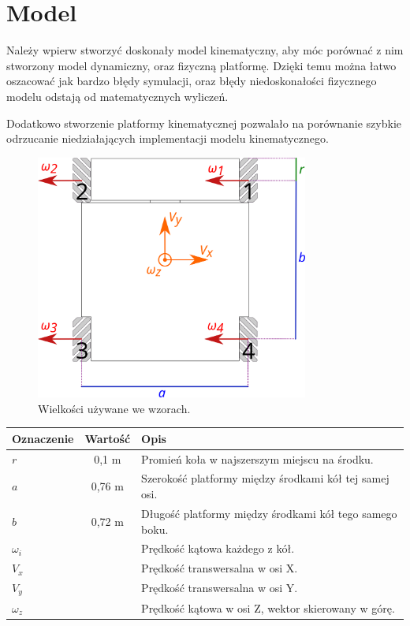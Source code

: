 \chapter{Model}
Należy wpierw stworzyć doskonały model kinematyczny, aby móc porównać z nim stworzony model dynamiczny, oraz fizyczną platformę.
Dzięki temu można łatwo oszacować jak bardzo błędy symulacji, oraz błędy niedoskonałości fizycznego modelu odstają od matematycznych wyliczeń.

Dodatkowo stworzenie platformy kinematycznej pozwalało na porównanie szybkie odrzucanie niedziałających implementacji modelu kinematycznego.
\begin{figure}[H]
\centering
 \includegraphics[width=0.8\textwidth]{graphics/base_dims.pdf}
\caption{Wielkości używane we wzorach.}
\end{figure} 
\begin{tabular}{l c l}
Oznaczenie & Wartość & Opis \\
\hline
$r$ & 0,1 m & Promień koła w najszerszym miejscu na środku. \\
$a$ & 0,76 m & Szerokość platformy między środkami kół tej samej osi. \\
$b$ & 0,72 m & Długość platformy między środkami kół tego samego boku. \\
$\omega_i$ & & Prędkość kątowa każdego z kół. \\
$V_x$ & & Prędkość transwersalna w osi X. \\
$V_y$ & & Prędkość transwersalna w osi Y. \\
$\omega_z$ & & Prędkość kątowa w osi Z, wektor skierowany w górę. \\
\end{tabular}

